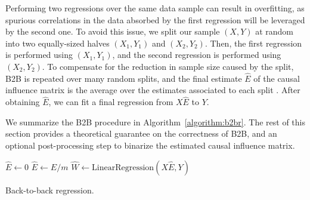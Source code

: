 \documentclass{article}
\begin{document}


Performing two regressions over the same data sample can result in overfitting, as spurious correlations in the data absorbed by the first regression will be leveraged by the second one.
%
To avoid this issue, we split our sample $(X, Y)$ at random into two equally-sized halves $(X_1, Y_1)$ and $(X_2, Y_2)$.
%
Then, the first regression is performed using $(X_1, Y_1)$, and the second regression is performed using $(X_2, Y_2)$.
%
To compensate for the reduction in sample size caused by the split, B2B is repeated over many random splits, and the final estimate $\hat E$ of the causal influence matrix is the average over the estimates associated to each split \citep{efron1992bootstrap}.
%
After obtaining $\hat{E}$, we can fit a final regression from $X \hat{E}$ to $Y$.

We summarize the B2B procedure in Algorithm~\ref{algorithm:b2br}.
%
The rest of this section provides a theoretical guarantee on the correctness of B2B, and an optional post-processing step to binarize the estimated causal influence matrix.



\begin{algorithm}[H]
    $\hat{E} \leftarrow 0$\;
    $\hat{E} \leftarrow \hat{E} / m$\;
    $\hat{W} \leftarrow \text{LinearRegression}(X \hat{E}, Y)$\;
    \caption{Back-to-back regression.}
    \label{algorithm:b2br}
\end{algorithm}
\end{document}
